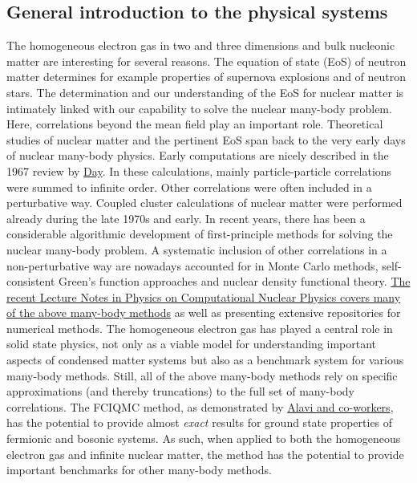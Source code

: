 \documentclass[%
oneside,                 %
final,                   %
10pt]{article}
\begin{document}
\subsection{General introduction to the  physical systems}

The homogeneous electron gas in two and three dimensions and 
bulk nucleonic matter are interesting for several reasons. The equation of state (EoS) of
neutron matter determines for example properties of supernova
explosions and of neutron
stars.
The determination and our understanding of the EoS for nuclear matter
is intimately linked with our capability to solve the nuclear
many-body problem. Here, correlations beyond the mean field play an
important role.  Theoretical studies of nuclear matter and the
pertinent EoS span back to the very early days of nuclear many-body
physics. Early computations are nicely described in the 1967 review by \href{{https://journals.aps.org/rmp/issues/39/4}}{Day}. 
In these calculations, mainly particle-particle
correlations were summed to infinite order.  Other correlations were
often included in a perturbative way. Coupled cluster calculations of
nuclear matter were performed already during the late 1970s and early. In recent years, there has been a
considerable algorithmic development of first-principle methods for
solving the nuclear many-body problem. A systematic inclusion of other
correlations in a non-perturbative way are nowadays accounted for in
Monte Carlo methods,
self-consistent Green's function approaches and 
nuclear density functional theory. \href{{https://github.com/ManyBodyPhysics/LectureNotesPhysics/blob/master/doc/src/lnp.pdf}}{The recent Lecture Notes in Physics on Computational Nuclear Physics covers many of the above many-body methods} as well as presenting extensive repositories for numerical methods.
The homogeneous electron gas has played a central role in solid state physics, not only as a viable model for understanding important aspects
of condensed matter systems  but also as a benchmark system for various many-body methods.  
Still, all of the above many-body methods rely on specific approximations (and thereby truncations) to the full set of many-body correlations.
The FCIQMC method, as demonstrated by \href{{http://www.nature.com/nature/journal/v493/n7432/full/nature11770.html}}{Alavi and co-workers}, has the potential to provide almost \emph{exact} results for ground state properties of fermionic and bosonic systems. As such, when applied to both the homogeneous electron gas and infinite nuclear matter, the method has the potential to provide important benchmarks for other many-body methods. 
\end{document}
